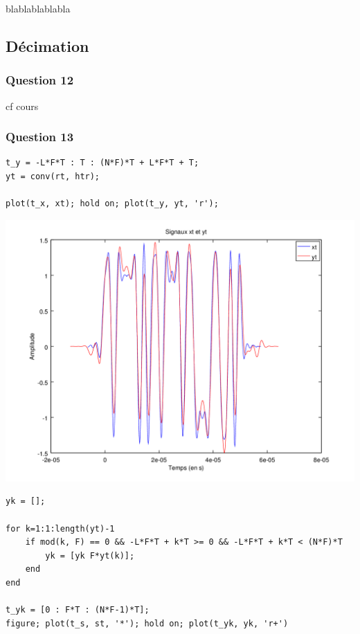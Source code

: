 \documentclass{acm_proc_article-sp}
\begin{document}
blablablablabla

\subsection{Décimation}

\subsubsection{Question 12}

cf cours

\subsubsection{Question 13}


\begin{lstlisting}
t_y = -L*F*T : T : (N*F)*T + L*F*T + T;
yt = conv(rt, htr);

plot(t_x, xt); hold on; plot(t_y, yt, 'r');
\end{lstlisting}

\begin{center}
\includegraphics[scale=0.45]{yt_13.png}
\end{center}

\begin{lstlisting}
yk = [];

for k=1:1:length(yt)-1
    if mod(k, F) == 0 && -L*F*T + k*T >= 0 && -L*F*T + k*T < (N*F)*T
        yk = [yk F*yt(k)];
    end
end

t_yk = [0 : F*T : (N*F-1)*T];
figure; plot(t_s, st, '*'); hold on; plot(t_yk, yk, 'r+')
\end{lstlisting}
\end{document}
